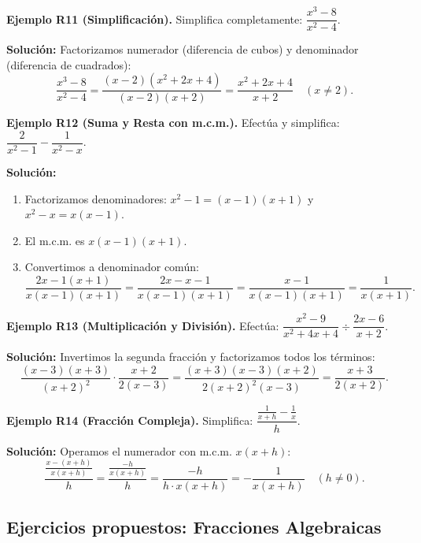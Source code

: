 \documentclass[12pt, letterpaper]{article}
\begin{document}
\textbf{Ejemplo R11 (Simplificación).} Simplifica completamente: $\dfrac{x^3 - 8}{x^2 - 4}$.

\begin{cuadrosolucion}
      \textbf{Solución:}
      Factorizamos numerador (diferencia de cubos) y denominador (diferencia de cuadrados):
      $$\frac{x^3 - 8}{x^2 - 4} = \frac{(x - 2)(x^2 + 2x + 4)}{(x - 2)(x + 2)} = \frac{x^2 + 2x + 4}{x + 2} \quad (x \neq 2).$$
\end{cuadrosolucion}

\textbf{Ejemplo R12 (Suma y Resta con m.c.m.).} Efectúa y simplifica: $\dfrac{2}{x^2 - 1} - \dfrac{1}{x^2 - x}$.

\begin{cuadrosolucion}
      \textbf{Solución:}
      \begin{enumerate}
            \item Factorizamos denominadores: $x^2 - 1 = (x - 1)(x + 1)$ y $x^2 - x = x(x - 1)$.
            \item El m.c.m. es $x(x - 1)(x + 1)$.
            \item Convertimos a denominador común:
                  $$\frac{2x - 1(x + 1)}{x(x - 1)(x + 1)} = \frac{2x - x - 1}{x(x - 1)(x + 1)} = \frac{x - 1}{x(x - 1)(x + 1)} = \frac{1}{x(x + 1)}.$$
      \end{enumerate}
\end{cuadrosolucion}

\textbf{Ejemplo R13 (Multiplicación y División).} Efectúa: $\dfrac{x^2 - 9}{x^2 + 4x + 4} \div \dfrac{2x - 6}{x + 2}$.

\begin{cuadrosolucion}
      \textbf{Solución:}
      Invertimos la segunda fracción y factorizamos todos los términos:
      $$\frac{(x - 3)(x + 3)}{(x + 2)^2} \cdot \frac{x + 2}{2(x - 3)} = \frac{(x + 3)(x - 3)(x + 2)}{2(x + 2)^2 (x - 3)} = \frac{x + 3}{2(x + 2)}.$$
\end{cuadrosolucion}

\textbf{Ejemplo R14 (Fracción Compleja).} Simplifica: $\dfrac{\frac{1}{x + h} - \frac{1}{x}}{h}$.

\begin{cuadrosolucion}
      \textbf{Solución:}
      Operamos el numerador con m.c.m. $x(x + h)$:
      $$\frac{\frac{x - (x + h)}{x(x + h)}}{h} = \frac{\frac{-h}{x(x + h)}}{h} = \frac{-h}{h \cdot x(x + h)} = -\frac{1}{x(x + h)} \quad (h \neq 0).$$
\end{cuadrosolucion}

\subsection{Ejercicios propuestos: Fracciones Algebraicas}
\end{document}

